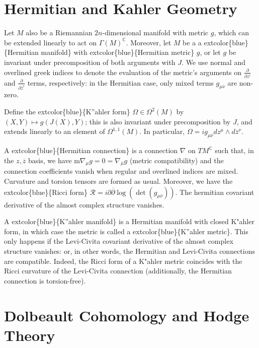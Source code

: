 \documentclass[
]{book}
\begin{document}
\hypertarget{hermitian-and-kahler-geometry}{%
\section{Hermitian and Kahler Geometry}\label{hermitian-and-kahler-geometry}}

Let \(M\) also be a Riemannian \(2n\)-dimensional manifold with metric \(g\), which can be extended linearly to act on \(\Gamma(M)^{\mathbb{C}}\). Moreover, let \(M\) be a a extcolor\{blue\}\{Hermitian manifold\} with extcolor\{blue\}\{Hermitian metric\} \(g\), or let \(g\) be invariant under precomposition of both arguments with \(J\). We use normal and overlined greek indices to denote the evaluation of the metric's arguments on \(\frac{\partial}{\partial z^i}\) and \(\frac{\partial}{\partial \overline{z}^i}\) terms, respectively: in the Hermitian case, only mixed terms \(g_{\mu\overline{\nu}}\) are non-zero.

Define the extcolor\{blue\}\{K''ahler form\} \(\Omega \in \Omega^2(M)\) by \((X, Y) \mapsto g(J(X), Y)\); this is also invariant under precomposition by \(J\), and extends linearly to an element of \(\Omega^{1,1}(M)\). In particular, \(\Omega = ig_{\mu\overline{\nu}} dz^\mu \wedge d\overline{z}^\nu\).

A extcolor\{blue\}\{Hermitian connection\} is a connection \(\nabla\) on \(TM^{\mathbb{C}}\) such that, in the \(z,\overline{z}\) basis, we have m\(\nabla_\mu g = 0 = \nabla_{\overline{\mu}} g\) (metric compatibility) and the connection coefficients vanish when regular and overlined indices are mixed. Curvature and torsion tensors are formed as usual. Moreover, we have the extcolor\{blue\}\{Ricci form\} \(\mathcal{R} = i \partial \overline{\partial} \log(\det(g_{\mu\overline{\nu}}))\). The hermitian covariant derivative of the almost complex structure vanishes.

A extcolor\{blue\}\{K''ahler manifold\} is a Hermitian manifold with closed K"ahler form, in which case the metric is called a extcolor\{blue\}\{K''ahler metric\}. This only happens if the Levi-Civita covariant derivative of the almost complex structure vanishes: or, in other words, the Hermitian and Levi-Civita connections are compatible. Indeed, the Ricci form of a K"ahler metric coincides with the Ricci curvature of the Levi-Civita connection (additionally, the Hermitian connection is torsion-free).

\hypertarget{dolbeault-cohomology-and-hodge-theory}{%
\section{Dolbeault Cohomology and Hodge Theory}\label{dolbeault-cohomology-and-hodge-theory}}
\end{document}
